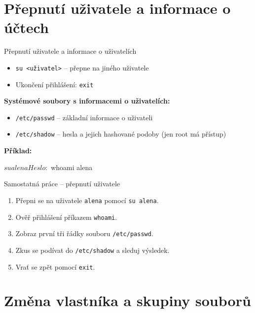\documentclass{beamer}
\begin{document}
\section{Přepnutí uživatele a informace o účtech}
\begin{frame}[fragile]{Přepnutí uživatele a informace o uživatelích}
	\begin{itemize}
		\item \texttt{su <uživatel>} – přepne na jiného uživatele  
		\item Ukončení přihlášení: \texttt{exit}
	\end{itemize}
	
	\vspace{1.5em}
	\textbf{Systémové soubory s informacemi o uživatelích:}
	\begin{itemize}
		\item \texttt{/etc/passwd} – základní informace o uživateli  
		\item \texttt{/etc/shadow} – hesla a jejich hashované podoby (jen root má přístup)
	\end{itemize}
	
	\vspace{1.5em}
	\textbf{Příklad:}
	\begin{semiverbatim}
		$ su alena
		Heslo:
		$ whoami
		alena
	\end{semiverbatim}
\end{frame}

\begin{frame}{Samostatná práce – přepnutí uživatele}
	\small
	\begin{enumerate}
		\item Přepni se na uživatele \texttt{alena} pomocí \texttt{su alena}.
		\item Ověř přihlášení příkazem \texttt{whoami}.
		\item Zobraz první tři řádky souboru \texttt{/etc/passwd}.
		\item Zkus se podívat do \texttt{/etc/shadow} a sleduj výsledek.
		\item Vrať se zpět pomocí \texttt{exit}.
	\end{enumerate}
\end{frame}

\section{Změna vlastníka a skupiny souborů}
\end{document}

